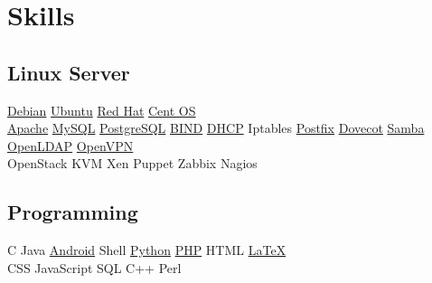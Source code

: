 \documentclass[]{deedy-resume-openfont}
\begin{document}
\begin{minipage}[t]{0.33\textwidth}

\section{Skills}
\subsection{Linux Server}
\href{http://www.debian.org/}{Debian} \textbullet{}
\href{http://www.ubuntu.com/}{Ubuntu} \textbullet{}
\href{http://www.redhat.com/}{Red Hat} \textbullet{}
\href{http://www.centos.org/}{Cent OS} \\
\href{http://httpd.apache.org/}{Apache} \textbullet{}
\href{https://www.mysql.com/}{MySQL} \textbullet{}
\href{http://www.postgresql.org/}{PostgreSQL} \textbullet{}
\href{https://www.isc.org/downloads/bind/}{BIND} \textbullet{}
\href{https://www.isc.org/downloads/dhcp/}{DHCP} \textbullet{}
Iptables \textbullet{}
\href{http://www.postfix.org/}{Postfix} \textbullet{}
\href{http://www.dovecot.org/}{Dovecot} \textbullet{}
\href{https://www.samba.org/}{Samba} \textbullet{}
\href{http://www.openldap.org/}{OpenLDAP} \textbullet{}
\href{https://openvpn.net/}{OpenVPN} \\
OpenStack \textbullet{}
KVM \textbullet{}
Xen \textbullet{}
Puppet \textbullet{}
Zabbix \textbullet{}
Nagios \textbullet{}
\sectionsep

\subsection{Programming}
C \textbullet{}
Java \textbullet{}
\href{http://android.com}{Android} \textbullet{}
Shell \textbullet{}
\href{http://www.python.org}{Python} \textbullet{}
\href{http://www.php.net}{PHP} \textbullet{}
HTML \textbullet{}
\href{http://www.latex-project.org}{\LaTeX}\\
CSS \textbullet{}
JavaScript \textbullet{}
SQL \textbullet{}
C++ \textbullet{}
Perl
\sectionsep


\end{minipage}
\end{document}

